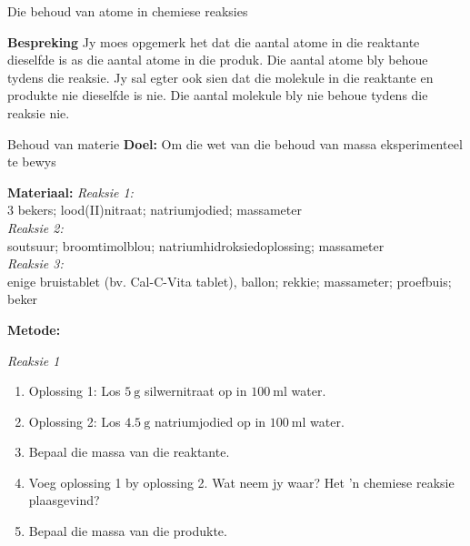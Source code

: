 \begin{activity}{Die behoud van atome in chemiese reaksies}
\begin{table}[H]
\begin{center}
 \end{center}

\end{table}

      \label{m38711*id65031}\noindent{}\textbf{Bespreking}
Jy moes opgemerk het dat die aantal atome in die reaktante dieselfde is as die aantal atome in die produk. Die aantal atome bly behoue tydens die reaksie. Jy sal egter ook sien dat die molekule in die reaktante en produkte nie dieselfde is nie. Die aantal molekule bly nie behoue tydens die reaksie nie.
 \par 
\end{activity}
\label{m38711*eip-14}
            \begin{i_experiment}{Behoud van materie}
            \nopagebreak
            \label{m38711*eip-453}\noindent{}\textbf{Doel:}
Om die wet van die behoud van massa eksperimenteel te bewys
\par 
\label{m38711*eip792}\noindent{}\textbf{Materiaal:}
\textsl{Reaksie 1:} \\
3 bekers; lood(II)nitraat; natriumjodied; massameter \\
\textsl{Reaksie 2:} \\
 soutsuur; broomtimolblou; natriumhidroksiedoplossing; massameter \\
 \textsl{Reaksie 3:} \\
enige bruistablet (bv. Cal-C-Vita tablet), ballon; rekkie; massameter; proefbuis; beker
\par 
\label{m38711*eip-153}
	\par
      \label{m38711*id72432}\noindent
\textbf{Metode:} \\
\begin{minipage}{.6\textwidth}
\textsl{Reaksie 1} 
\label{m38711*id6342}\begin{enumerate}[noitemsep, label=\textbf{\arabic*}. ] 
            \item Oplossing 1: Los $5~\text{g}$ silwernitraat op in $100~\text{ml}$ water.
\item Oplossing 2: Los $4.5~\text{g}$ natriumjodied op in $100~\text{ml}$ water.
\item Bepaal die massa van die reaktante.
\item Voeg oplossing 1 by oplossing 2. Wat neem jy waar? Het 'n chemiese reaksie plaasgevind? 
\item Bepaal die massa van die produkte. 

\end{enumerate}
\end{minipage}
\end{i_experiment}
